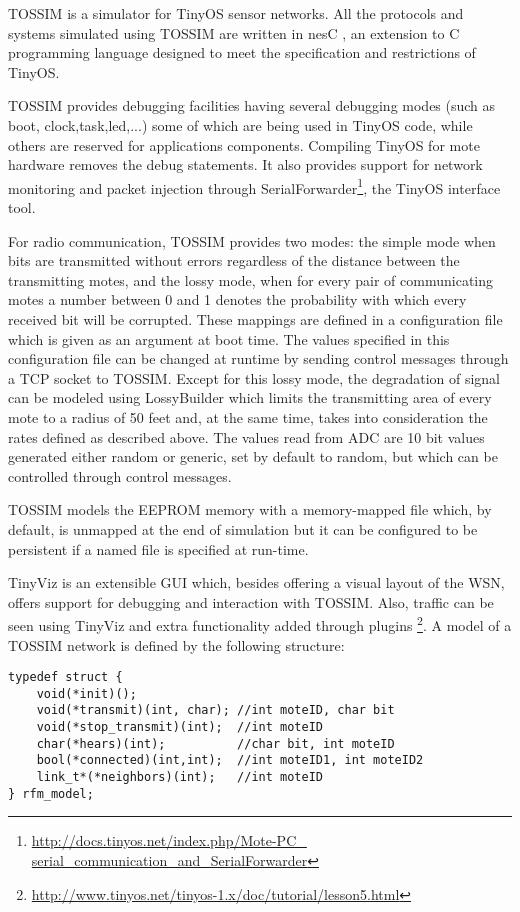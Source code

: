 \label{subsec:tossim}
TOSSIM\cite{tossim} is a simulator for TinyOS sensor networks.
All the protocols and systems simulated using TOSSIM are written in nesC \cite{nesC},
an extension to C programming language designed to meet the specification and 
restrictions of TinyOS. 

TOSSIM provides debugging facilities having several debugging modes 
(such as boot, clock,task,led,...) some of which are being used in TinyOS code, 
while others are reserved for applications components. Compiling TinyOS for mote
hardware removes the debug statements.
It also provides support for network monitoring and packet injection
through SerialForwarder\footnote{\url{http://docs.tinyos.net/index.php/Mote-PC_
serial_communication_and_SerialForwarder}}, the TinyOS interface tool.

For radio communication, TOSSIM provides two modes: the simple mode when bits
are transmitted without errors regardless of the distance between the transmitting
motes, and the lossy mode, when for every pair of communicating motes a number between 0 and 1 
denotes the probability with which every received bit will be corrupted. These 
mappings are defined in a configuration file which is given as an argument at boot
time. The values specified in this configuration file can be changed at runtime
by sending control messages through a TCP socket to TOSSIM.
 Except for this lossy mode, the degradation of signal can be modeled using
LossyBuilder which limits the transmitting area of every mote to a radius of 50
 feet and, at the same time, takes into consideration the rates defined as 
described above.
The values read from ADC are 10 bit values generated either random or generic, set
by default to random, but which can be controlled through control messages.

TOSSIM models the EEPROM memory with a memory-mapped file which, by default, is
unmapped at the end of simulation but it can be configured to be persistent if a
named file is specified at run-time.

TinyViz is an extensible GUI which, besides offering a visual layout of the 
WSN, offers support for debugging and interaction with TOSSIM. Also, traffic can
be seen using TinyViz and extra functionality added through plugins
\footnote{\url{http://www.tinyos.net/tinyos-1.x/doc/tutorial/lesson5.html}}.
A model of a TOSSIM network is defined by the following structure:
\lstset{numbers=none,captionpos=b,frame=single,language=C,caption=Structure for defining a network in TOSSIM,label=lst:tossimnet}
\begin{lstlisting}
typedef struct {
    void(*init)();
    void(*transmit)(int, char); //int moteID, char bit
    void(*stop_transmit)(int);  //int moteID
    char(*hears)(int);          //char bit, int moteID
    bool(*connected)(int,int);  //int moteID1, int moteID2
    link_t*(*neighbors)(int);   //int moteID
} rfm_model;
\end{lstlisting}

